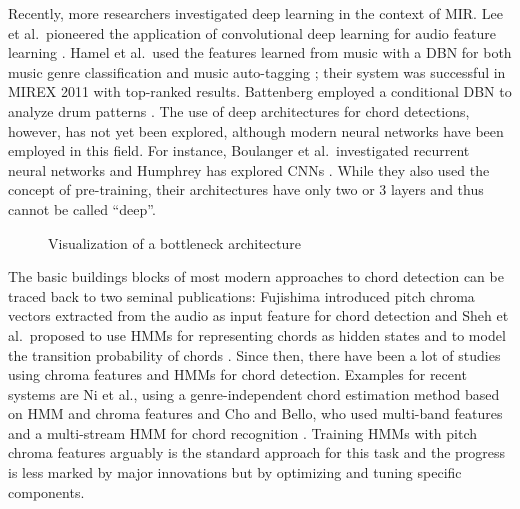\documentclass{article}
\begin{document}
Recently, more researchers investigated deep learning in the context of MIR. Lee et al.\ pioneered the application of convolutional deep learning for audio feature learning \cite{lee2009unsupervised}. Hamel et al.\ used the features learned from music with a DBN for both music genre classification and music auto-tagging \cite{hamel2010learning}; their system was successful in MIREX 2011 with top-ranked results. Battenberg employed a conditional DBN to analyze drum patterns \cite{battenberg2012analyzing}. The use of deep architectures for chord detections, however, has not yet been explored, although modern neural networks have been employed in this field. For instance, Boulanger et al.\ investigated recurrent neural networks \cite{boulanger2013audio} and Humphrey has explored CNNs \cite{humphrey2012rethinking,humphrey2012learning}. While they also used the concept of pre-training, their architectures have only two or 3 layers and thus cannot be called ``deep''.
\begin{figure}
 \centerline{}
 \caption{Visualization of a bottleneck architecture}
 \label{fig:bottleneck}
\end{figure}

The basic buildings blocks of most modern approaches to chord detection can be traced back to two seminal publications: Fujishima introduced pitch chroma vectors extracted from the audio as input feature for chord detection \cite{fujishima1999realtime} and Sheh et al.\ proposed to use HMMs for representing chords as hidden states and to model the transition probability of chords \cite{sheh2003chord}. Since then, there have been a lot of studies using chroma features and HMMs for chord detection\cite{papadopoulos2007large,cho2010exploring}. Examples for recent systems are  Ni et al., using a genre-independent chord estimation method based on HMM and chroma features \cite{ni2012using} and Cho and Bello, who used multi-band features and a multi-stream HMM for chord recognition \cite{cho2013mirex}. Training HMMs with pitch chroma features arguably is the standard approach for this task and the progress is less marked by major innovations but by optimizing and tuning specific components. 
\end{document}
